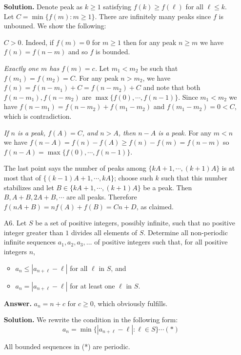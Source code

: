 \documentclass[11pt,a4paper]{article}
\begin{document}
\begin{enumerate}
		\textbf{Solution.} 
		Denote peak as $k\ge 1$ satisfying $f(k)\ge f(\ell)$ for all $\ell\le k$. Let $C = \min \{f(m): m\ge 1\}$. There are infinitely many peaks since $f$ is unbouned. We show the following: 
		
		\textit{$C > 0$.} Indeed, if $f(m) = 0$ for $m\ge 1$ then for any peak $n\ge m$ we have $f(n)=f(n-m)$ and so $f$ is bounded. 
		
		\textit{Exactly one $m$ has $f(m)=c$.} Let $m_1 < m_2$ be such that $f(m_1)=f(m_2)=C$. 
		For any peak $n > m_2$, we have $f(n)=f(n-m_1)+C=f(n-m_2)+C$ and note that both $f(n-m_1), f(n-m_2)$ are $\max \{f(0), \cdots, f(n-1)\}$. 
		Since $m_1<m_2$ we have $f(n-m_1)=f(n-m_2)+f(m_1-m_2)$ and $f(m_1-m_2)=0 < C$, which is contradiction.
		
		\textit{If $n$ is a peak, $f(A)=C$, and $n>A$,  then $n - A$ is a peak.}
		For any $m < n$ we have $f(n-A)=f(n)-f(A)\ge f(n)-f(m)=f(n-m)$ so $f(n - A) = \max \{f(0), \cdots,  f(n - 1)\}$. 
		
		The last point says the number of peaks among $\{kA+1, \cdots, (k+1)A\}$ is at most that of $\{(k-1)A+1, \cdots, kA\}$; choose such $k$ such that this number stabilizes and let $B\in \{kA+1, \cdots, (k+1)A\}$ be a peak. 
		Then $B, A+B, 2A+B, \cdots$ are all peaks. Therefore $f(nA+B)=nf(A)+f(B)=Cn+D$, as claimed. 
		
		\item [A6.]
		Let $S$ be a set of positive integers, possibly infinite, such that no positive integer greater than $1$ divides all elements of $S$. Determine all non-periodic infinite sequences $a_1,a_2,a_3,\dots$ of positive integers such that, for all positive integers $n$,
		\begin{itemize}
			\item $a_n\leqslant |a_{n+\ell}-\ell|$ for all $\ell$ in $S$, and
			\item $a_n=|a_{n+\ell}-\ell|$ for at least one $\ell$ in $S$.
		\end{itemize}
		
		\textbf{Answer.} $a_n = n + c$ for $c\ge 0$, 
		which obviously fulfills. 
		
		\textbf{Solution.} We rewrite the condition in the following form: \[
		a_n = \min \{|a_{n+\ell} - \ell|: \ell\in S\} \cdots (*)
		\]
		
		\begin{lemma}
			 All bounded sequences in (*) are periodic. 
		\end{lemma}
	

\end{enumerate}
\end{document}
